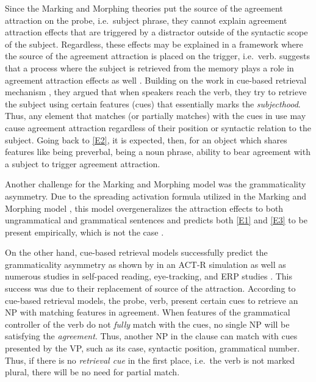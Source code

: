 \documentclass[doc]{apa6}
\begin{document}
Since the Marking and Morphing theories put the source of the agreement attraction on the probe, i.e.~subject phrase, they cannot explain agreement attraction effects that are triggered by a distractor outside of the syntactic scope of the subject. Regardless, these effects may be explained in a framework where the source of the agreement attraction is placed on the trigger, i.e.~verb. \textcite{Badecker2007} suggests that a process where the subject is retrieved from the memory plays a role in agreement attraction effects as well \autocite[see as well][]{Wagers2009}. Building on the work in cue-based retrieval mechanism \autocites{Gordon2001}{Lewis2005}[ among others]{Lewis2006}, they argued that when speakers reach the verb, they try to retrieve the subject using certain features (cues) that essentially marks the \emph{subjecthood}. Thus, any element that matches (or partially matches) with the cues in use may cause agreement attraction regardless of their position or syntactic relation to the subject. Going back to \autoref{E2}, it is expected, then, for an object which shares features like being preverbal, being a noun phrase, ability to bear agreement with a subject to trigger agreement attraction.

Another challenge for the Marking and Morphing model was the grammaticality asymmetry. Due to the spreading activation formula utilized in the Marking and Morphing model \autocite[see][]{Dell1986}, this model overgeneralizes the attraction effects to both ungrammatical and grammatical sentences and predicts both \autoref{E1} and \autoref{E3} to be present empirically, which is not the case \autocite{Wagers2009}.

\begin{exe}
\label{E3}
\end{exe}

On the other hand, cue-based retrieval models successfully predict the grammaticality asymmetry as shown by \textcite{Dillon2013} in an ACT-R simulation as well as numerous studies in self-paced reading, eye-tracking, and ERP studies \autocites{Wagers2009}{Tucker2010}{Tanner2014}[ among others]{Lago2015}. This success was due to their replacement of source of the attraction. According to cue-based retrieval models, the probe, verb, present certain cues to retrieve an NP with matching features in agreement. When features of the grammatical controller of the verb do not \emph{fully} match with the cues, no single NP will be satisfying the \emph{agreement}. Thus, another NP in the clause can match with cues presented by the VP, such as its case, syntactic position, grammatical number. Thus, if there is no \emph{retrieval cue} in the first place, i.e.~the verb is not marked plural, there will be no need for partial match.
\end{document}

